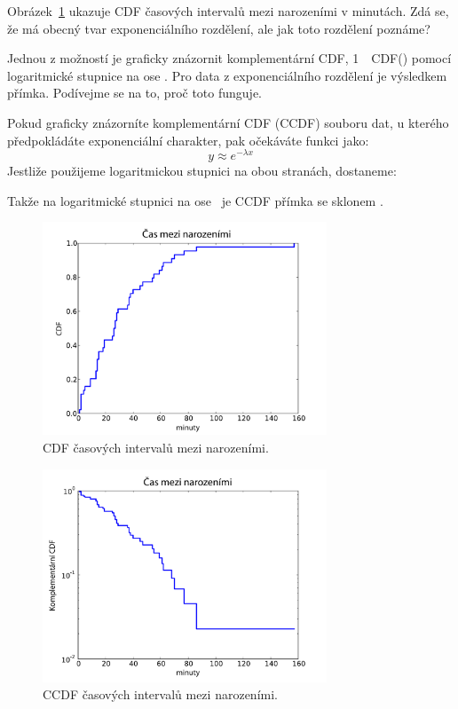 \documentclass[12pt]{book}
\begin{document}
Obrázek~\ref{interarrival_cdf} ukazuje CDF časových intervalů mezi narozeními v minutách. Zdá se, že má obecný tvar exponenciálního rozdělení, ale jak toto rozdělení poznáme?

Jednou z možností je graficky znázornit komplementární CDF, 1~\minus~CDF(\x) pomocí logaritmické stupnice na ose \y.  Pro data z exponenciálního rozdělení je výsledkem přímka. Podívejme se na to, proč toto funguje.

Pokud graficky znázorníte komplementární CDF (CCDF) souboru dat, u kterého předpokládáte exponenciální charakter, pak očekáváte funkci jako:
%
\[ y \approx e^{-\lambda x} \]
%
Jestliže použijeme logaritmickou stupnici na obou stranách, dostaneme:


Takže na logaritmické stupnici na ose \y~je CCDF přímka se sklonem
\minus\mylambda.

\begin{figure}
\centerline{\includegraphics[height=2.5in]{figs/interarrivals.pdf}}
\caption{CDF časových intervalů mezi narozeními.}
\label{interarrival_cdf}
\end{figure}

\begin{figure}
\centerline{\includegraphics[height=2.5in]{figs/interarrivals_logy.pdf}}
\caption{CCDF časových intervalů mezi narozeními.}
\label{interarrival_ccdf}
\end{figure}
\end{document}
